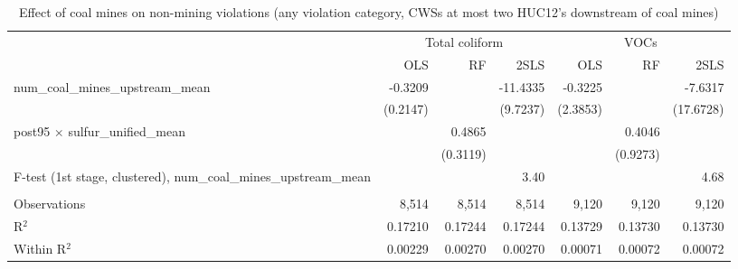 
\begin{table}[htbp]
   
   \caption{\label{2sls_dwnstrm2step_nonminevio_allcat} Effect of coal mines on non-mining violations (any violation category, CWSs at most two HUC12's downstream of coal mines)}
   \bigskip
   
   \centering
   
   \begin{adjustbox}{width = \textwidth, center}
      
      
      \begin{tabular}{lrrrrrr}
         \toprule
         
          & \multicolumn{3}{c}{Total coliform} & \multicolumn{3}{c}{VOCs}\\
         
                                                                             & OLS      & RF       & 2SLS     & OLS      & RF       & 2SLS\\  
         
         \midrule 
         num\_coal\_mines\_upstream\_mean                                    & -0.3209  &          & -11.4335 & -0.3225  &          & -7.6317\\   
                                                                             & (0.2147) &          & (9.7237) & (2.3853) &          & (17.6728)\\   
         post95 $\times$ sulfur\_unified\_mean                               &          & 0.4865   &          &          & 0.4046   &   \\   
                                                                             &          & (0.3119) &          &          & (0.9273) &   \\   
         
         F-test (1st stage, clustered), num\_coal\_mines\_upstream\_mean     &          &          & 3.40     &          &          & 4.68\\  
         
          \\
         
         Observations                                                        & 8,514    & 8,514    & 8,514    & 9,120    & 9,120    & 9,120\\  
         R$^2$                                                               & 0.17210  & 0.17244  & 0.17244  & 0.13729  & 0.13730  & 0.13730\\  
         Within R$^2$                                                        & 0.00229  & 0.00270  & 0.00270  & 0.00071  & 0.00072  & 0.00072\\  
         

\end{tabular}
\end{adjustbox}
\end{table}
